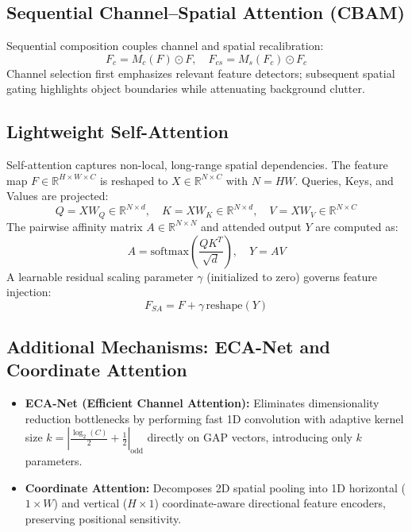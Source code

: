 \documentclass[11pt,a4paper]{article}
\begin{document}
\subsection{Sequential Channel--Spatial Attention (CBAM)}
Sequential composition couples channel and spatial recalibration:
\begin{equation}
F_c = M_c(F) \odot F, \quad F_{cs} = M_s(F_c) \odot F_c
\end{equation}
Channel selection first emphasizes relevant feature detectors; subsequent spatial gating highlights object boundaries while attenuating background clutter.

\subsection{Lightweight Self-Attention}
Self-attention captures non-local, long-range spatial dependencies. The feature map $F \in \mathbb{R}^{H \times W \times C}$ is reshaped to $X \in \mathbb{R}^{N \times C}$ with $N = HW$. Queries, Keys, and Values are projected:
\begin{equation}
Q = X W_Q \in \mathbb{R}^{N \times d}, \quad K = X W_K \in \mathbb{R}^{N \times d}, \quad V = X W_V \in \mathbb{R}^{N \times C}
\end{equation}
The pairwise affinity matrix $A \in \mathbb{R}^{N \times N}$ and attended output $Y$ are computed as:
\begin{equation}
A = \text{softmax}\left(\frac{Q K^T}{\sqrt{d}}\right), \quad Y = A V
\end{equation}
A learnable residual scaling parameter $\gamma$ (initialized to zero) governs feature injection:
\begin{equation}
F_{SA} = F + \gamma \, \text{reshape}(Y)
\end{equation}

\subsection{Additional Mechanisms: ECA-Net and Coordinate Attention}
\begin{itemize}[noitemsep,topsep=0pt]
    \item \textbf{ECA-Net (Efficient Channel Attention):} Eliminates dimensionality reduction bottlenecks by performing fast 1D convolution with adaptive kernel size $k = |\frac{\log_2(C)}{2} + \frac{1}{2}|_{\text{odd}}$ directly on GAP vectors, introducing only $k$ parameters.
    \item \textbf{Coordinate Attention:} Decomposes 2D spatial pooling into 1D horizontal ($1 \times W$) and vertical ($H \times 1$) coordinate-aware directional feature encoders, preserving positional sensitivity.
\end{itemize}
\end{document}
